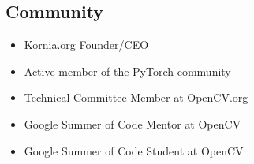\subsection{Community}
\begin{itemize}
\item Kornia.org Founder/CEO
\item Active member of the PyTorch community
\item Technical Committee Member at OpenCV.org
\item Google Summer of Code Mentor at OpenCV
\item Google Summer of Code Student at OpenCV
\end{itemize}